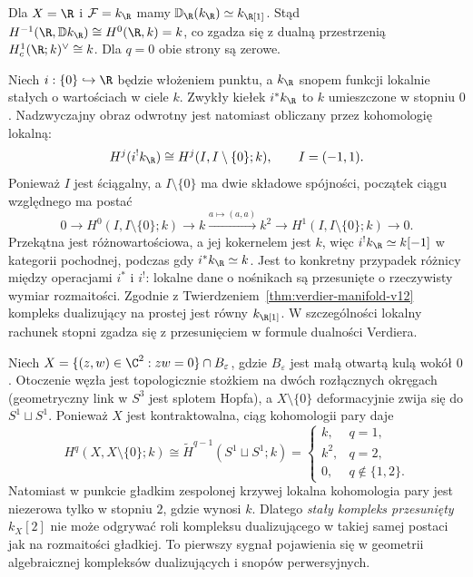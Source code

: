 \begin{przyklad}
Dla $X=\R$ i $\mathcal F=k_\R$ mamy
$\mathbb D_\R(k_\R)\simeq k_\R[1]$.
Stąd $H^{-1}(\R,\mathbb D k_\R)\cong H^0(\R,k)=k$,
co zgadza się z dualną przestrzenią
$H_c^1(\R;k)^\vee\cong k$.
Dla $q=0$ obie strony są zerowe.
\end{przyklad}

\begin{przyklad}
\label{prz:verdier-real-line-costalk-23}
Niech $i:\{0\}\hookrightarrow\R$ będzie włożeniem punktu,
a $k_\R$ snopem funkcji lokalnie stałych o wartościach w ciele
$k$. Zwykły kiełek $i^*k_\R$ to $k$ umieszczone w stopniu
$0$. Nadzwyczajny obraz odwrotny jest natomiast obliczany
przez kohomologię lokalną:
\[
 H^j(i^!k_\R)\cong H^j(I,I\setminus\{0\};k),
 \qquad I=(-1,1).
\]
Ponieważ $I$ jest ściągalny, a $I\setminus\{0\}$ ma
dwie składowe spójności, początek ciągu względnego ma postać
\[
 0\longrightarrow H^0(I,I\setminus\{0\};k)
 \longrightarrow k\xrightarrow{a\mapsto(a,a)} k^2
 \longrightarrow H^1(I,I\setminus\{0\};k)
 \longrightarrow0.
\]
Przekątna jest różnowartościowa, a jej kokernelem jest $k$,
więc $i^!k_\R\simeq k[-1]$ w kategorii pochodnej,
podczas gdy $i^*k_\R\simeq k$.
Jest to konkretny przypadek różnicy między operacjami
$i^*$ i $i^!$: lokalne dane o nośnikach są przesunięte
o rzeczywisty wymiar rozmaitości.
Zgodnie z Twierdzeniem~\ref{thm:verdier-manifold-v12}
kompleks dualizujący na prostej jest równy $k_\R[1]$.
W szczególności lokalny rachunek stopni zgadza się
z przesunięciem w formule dualności Verdiera.
\end{przyklad}

\begin{przyklad}
\label{ex:node-duality-v12}
Niech $X=\{(z,w)\in\C^2:zw=0\}\cap B_\varepsilon$,
gdzie $B_\varepsilon$ jest małą otwartą kulą wokół $0$.
Otoczenie węzła jest topologicznie stożkiem na
dwóch rozłącznych okręgach (geometryczny link w $S^3$
jest splotem Hopfa), a $X\setminus\{0\}$ deformacyjnie zwija się
do $S^1\sqcup S^1$. Ponieważ $X$ jest kontraktowalna,
ciąg kohomologii pary daje
\[
H^q(X,X\setminus\{0\};k)\cong
\widetilde H^{q-1}(S^1\sqcup S^1;k)
=\begin{cases}
k,&q=1,\\k^2,&q=2,\\0,&q\notin\{1,2\}.
\end{cases}
\]
Natomiast w punkcie gładkim zespolonej krzywej
lokalna kohomologia pary jest niezerowa tylko w stopniu $2$,
gdzie wynosi $k$. Dlatego \emph{stały kompleks przesunięty}
$k_X[2]$ nie może odgrywać roli kompleksu dualizującego
w takiej samej postaci jak na rozmaitości gładkiej.
To pierwszy sygnał pojawienia się w geometrii
algebraicznej kompleksów dualizujących i snopów perwersyjnych.
\end{przyklad}

